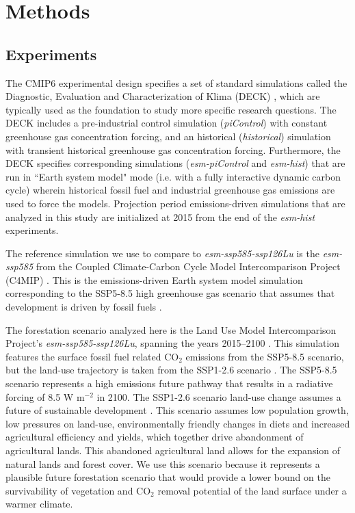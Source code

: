 \documentclass[draft]{agujournal2019}
\begin{document}
\section{Methods}

\subsection{Experiments}

The CMIP6 experimental design specifies a set of standard simulations called the Diagnostic, Evaluation and Characterization of Klima (DECK) \cite{eyring_overview_2016}, which are typically used as the foundation to study more specific research questions.
The DECK includes a pre-industrial control simulation (\textit{piControl}) with constant greenhouse gas concentration forcing, and an historical (\textit{historical}) simulation with transient historical greenhouse gas concentration forcing.
Furthermore, the DECK specifies corresponding simulations (\textit{esm-piControl} and \textit{esm-hist}) that are run in ``Earth system model" mode (i.e. with a fully interactive dynamic carbon cycle) wherein historical fossil fuel and industrial greenhouse gas emissions are used to force the models.
Projection period emissions-driven simulations that are analyzed in this study are initialized at 2015 from the end of the \textit{esm-hist} experiments.

The reference simulation we use to compare to \textit{esm-ssp585-ssp126Lu} is the \textit{esm-ssp585} from the Coupled Climate-Carbon Cycle Model Intercomparison Project (C4MIP) \cite{jones_c4mip_2016}.
This is the emissions-driven Earth system model simulation corresponding to the SSP5-8.5 high greenhouse gas scenario that assumes that development is driven by fossil fuels \cite{oneill_scenario_2016}.

The forestation scenario analyzed here is the Land Use Model Intercomparison Project's \textit{esm-ssp585-ssp126Lu}, spanning the years 2015--2100 \cite{lawrence_land_2016}.
This simulation features the surface fossil fuel related CO$_{2}$ emissions from the SSP5-8.5 scenario, but the land-use trajectory is taken from the SSP1-2.6 scenario \cite{oneill_scenario_2016}.
The SSP5-8.5 scenario represents a high emissions future pathway that results in a radiative forcing of 8.5 W m$^{-2}$ in 2100.
The SSP1-2.6 scenario land-use change assumes a future of sustainable development \cite{van_vuuren_energy_2017}.
This scenario assumes low population growth, low pressures on land-use, environmentally friendly changes in diets and increased agricultural efficiency and yields, which together drive abandonment of agricultural lands.
This abandoned agricultural land allows for the expansion of natural lands and forest cover.
We use this scenario because it represents a plausible future forestation scenario that would provide a lower bound on the survivability of vegetation and CO$_2$ removal potential of the land surface under a warmer climate.
\end{document}
